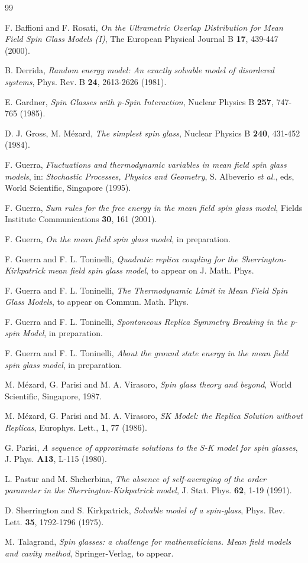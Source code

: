 \documentclass[a4paper,12pt]{article}
\begin{document}
\begin{thebibliography}{99}

 F. Baffioni and F. Rosati, 
\textit{On the Ultrametric Overlap Distribution for Mean Field Spin Glass 
Models (I)}, The European Physical Journal B
\textbf{17},  439-447 (2000).

 B. Derrida, {\sl Random energy model: An exactly 
solvable model of disordered systems}, Phys. Rev. B {\bf 24}, 2613-2626
 (1981).

 E. Gardner,
{\sl Spin Glasses with p-Spin Interaction},
Nuclear Physics B {\bf257},  747-765 (1985). 

 D. J. Gross, M. M\'ezard, 
{\sl The simplest spin glass}, 
Nuclear Physics B {\bf 240}, 431-452 (1984).

 F. Guerra, 
{\sl Fluctuations and thermodynamic variables in mean
field spin glass models}, in:  {\sl Stochastic Processes, Physics and
Geometry}, S. Albeverio {\it et al.}, eds, World Scientific, Singapore 
(1995).

 F. Guerra,  
{\sl Sum rules for the free energy in the mean 
field spin glass model}, Fields Institute 
Communications {\bf 30}, 161 (2001).

 F. Guerra,  
{\sl On the mean field spin glass model}, in preparation.

 F. Guerra and F. L. Toninelli, {\sl Quadratic replica 
coupling for 
the Sherrington-Kirkpatrick mean field spin glass model}, to appear on J.
Math. Phys.

 F. Guerra and F. L. Toninelli, {\sl The Thermodynamic Limit 
in Mean Field Spin Glass Models}, to appear on Commun. Math. Phys.

 F. Guerra and F. L. Toninelli, {\sl Spontaneous Replica 
Symmetry Breaking in the p-spin Model}, in preparation.

 F. Guerra and F. L. Toninelli, {\sl About the ground state 
energy in the mean field spin glass model}, in preparation.

 M. M\'ezard, G. Parisi and M. A. Virasoro, \textit{ Spin glass theory
and beyond}, World Scientific, Singapore, 1987.

 M. M\'ezard, G. Parisi and M. A. Virasoro, {\sl 
SK Model: the
Replica Solution without Replicas}, Europhys. Lett., {\bf1}, 77 (1986).

 G. Parisi, {\sl A sequence of approximate solutions to the S-K
model for spin glasses}, J. Phys. {\bf A13}, L-115 (1980).

 L. Pastur and M. Shcherbina, 
{\sl The absence of self-averaging of the order parameter 
in the Sherrington-Kirkpatrick model}, 
J. Stat. Phys. {\bf 62}, 1-19 (1991).

 D. Sherrington and S. Kirkpatrick, 
{\sl Solvable model of a spin-glass}, 
Phys. Rev. Lett. {\bf 35}, 1792-1796 (1975).

 M. Talagrand, 
\textit{ Spin glasses: a challenge for mathematicians. Mean field models and 
cavity method}, Springer-Verlag, to appear.


\end{thebibliography}
\end{document}
